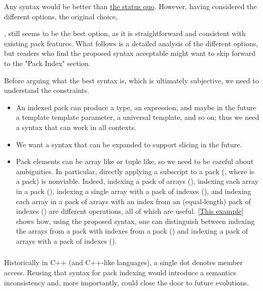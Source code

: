\documentclass{wg21}
\begin{document}
Any syntax would be better than
\href{https://twitter.com/incomputable/status/1590733659694583808}{the status quo}.
However, having considered the different options, the original choice,

, still seems to be the best option, as it is straightforward
and consistent with existing pack features.  What follows is a detailed
analysis of the different options, but readers who find the proposed syntax acceptable might want to skip forward to
the "Pack Index" section.

Before arguing what the best syntax is, which is ultimately subjective, we need to understand the constraints.
\begin{itemize}
\item An indexed pack can produce a type, an expression, and maybe in the future a template template parameter, a universal template, and so on; thus we need a syntax
that can work in all contexts.

\item We want a syntax that can be expanded to support slicing in the future.

\item Pack elements can be array like or tuple like, so we need to be careful
  about ambiguities. In particular, directly applying a subscript to a pack
  (, where  is a pack) is nonviable. Indeed, indexing a
  pack of arrays (), indexing each array in a pack
  (), indexing a single array with a pack of indexes
  (), and indexing each array in a pack of arrays
  with an index from an (equal-length) pack of indexes
  () are different operations, all of which are
  useful. [\href{https://compiler-explorer.com/z/E86h8eMG1}{This example}]
  shows how, using the proposed syntax, one can distinguish between indexing
  the arrays from a pack with indexes from a pack
  () and indexing a pack of arrays with a pack
  of indexes ().
\end{itemize}

\subsubsection{}

Historically in C++ (and C++-like languages), a single dot denotes member access.
Reusing that syntax for pack indexing would introduce a semantics inconsistency and, more importantly, could close the door to future evolutions.
\end{document}
